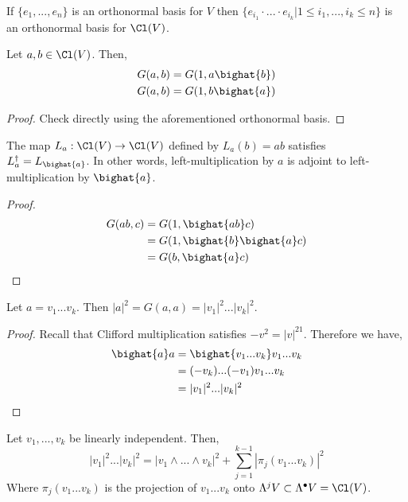\begin{remark*}
    If $\{e_1,...,e_n\}$ is an orthonormal basis for $V$ then $\{e_{i_1}\cdot...\cdot e_{i_k} | 1\leq i_1,...,i_k\leq n\}$ is an orthonormal basis for $\Cl(V)$.
\end{remark*}
\begin{thm}
    Let $a,b\in \Cl(V)$. Then,
    \begin{align*}
        G(a,b) &= G(1,a\bighat{b})\\
        G(a,b) &= G(1,b\bighat{a})
    \end{align*}
\end{thm}
\begin{proof}
    Check directly using the aforementioned orthonormal basis.
\end{proof}
\begin{cor}
    The map $L_a : \Cl(V)\to \Cl(V)$ defined by $L_a(b)=ab$ satisfies $L_a^\dagger = L_{\bighat{a}}$. In other words, left-multiplication by $a$ is adjoint to left-multiplication by $\bighat{a}$.
\end{cor}
\begin{proof}
    \begin{align*}G(ab,c) &= G(1,\bighat{ab}c) \\&= G(1,\bighat{b}\bighat{a}c) \\&= G(b,\bighat{a}c)\end{align*}
\end{proof}
\begin{cor}
    Let $a = v_1...v_k$. Then $|a|^2 = G(a,a) = |v_1|^2...|v_k|^2$.
\end{cor}
\begin{proof}
Recall that Clifford multiplication satisfies $-v^2 = |v|^21$. Therefore we have,
    \begin{align*}
        \bighat{a}a &= \bighat{v_1...v_k}v_1...v_k\\
        &= (-v_k)...(-v_1)v_1...v_k\\
        &= |v_1|^2...|v_k|^2
    \end{align*}
\end{proof}
\begin{thm}
    Let $v_1,...,v_k$ be linearly independent. Then,
    \begin{equation}
        |v_1|^2 ... |v_k|^2 = |v_1\wedge...\wedge v_k|^2 + \sum_{j=1}^{k-1}|\pi_j(v_1...v_k)|^2
    \end{equation}
    Where $\pi_j(v_1...v_k)$ is the projection of $v_1...v_k$ onto $\Lambda^j V\subset\Lambda^\bullet V=\Cl(V)$.
\end{thm}
